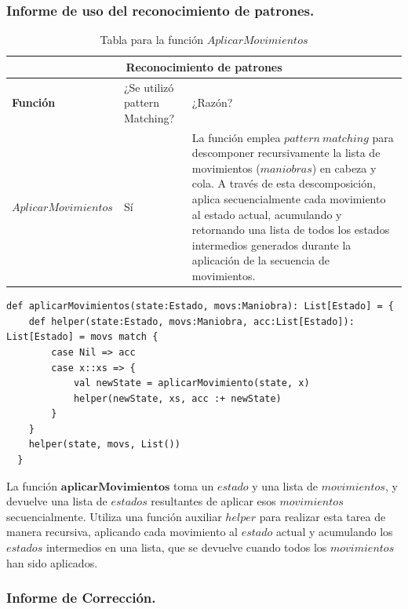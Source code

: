 \documentclass[12pt, a4paper]{article}
\begin{document}
\subsubsection{Informe de uso del reconocimiento de patrones.}
\begin{table}[H]
  \scriptsize
 \begin{tabular}{ |p{4cm}|p{3cm}|p{5.5cm}|  }
  \hline
  \multicolumn{3}{|c|}{Reconocimiento de patrones} \\
  \hline
  \textbf{Función}& ¿Se utilizó pattern Matching?  & ¿Razón?\\
  \hline
  $AplicarMovimientos$  & Sí &  La función emplea $pattern~matching$ para descomponer recursivamente la lista de movimientos ($maniobras$) en cabeza y cola. A través de esta descomposición, aplica secuencialmente cada movimiento al estado actual, acumulando y retornando una lista de todos los estados intermedios generados durante la aplicación de la secuencia de movimientos.\\
  \hline
 \end{tabular}
 \centering
 \caption{Tabla para la función $AplicarMovimientos$}
 \end{table}
 \begin{lstlisting}[caption=Código en Scala para la funcion aplicarMovimientos, label=lst:scala_code]
  def aplicarMovimientos(state:Estado, movs:Maniobra): List[Estado] = {
    def helper(state:Estado, movs:Maniobra, acc:List[Estado]): List[Estado] = movs match {
        case Nil => acc
        case x::xs => {
            val newState = aplicarMovimiento(state, x)  
            helper(newState, xs, acc :+ newState)
        }
    }
    helper(state, movs, List())   
  }
  \end{lstlisting}
  La función $\textbf{aplicarMovimientos}$ toma un $estado$ y una lista de $movimientos$, y devuelve una lista de $estados$ resultantes de aplicar esos $movimientos$ secuencialmente. Utiliza una función auxiliar $helper$ para realizar esta tarea de manera recursiva, aplicando cada movimiento al $estado$ actual y acumulando los $estados$ intermedios en una lista, que se devuelve cuando todos los $movimientos$ han sido aplicados.
  \newpage{}
  \subsubsection{Informe de Corrección.}
\end{document}
